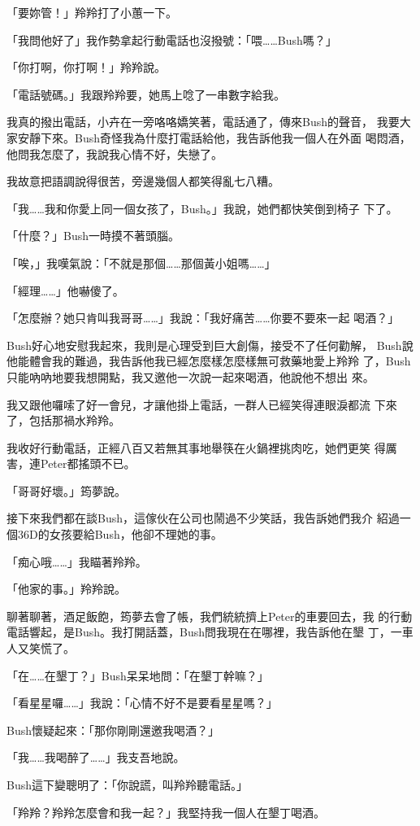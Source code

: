 「要妳管！」羚羚打了小蕙一下。

「我問他好了」我作勢拿起行動電話也沒撥號：「喂……Bush嗎？」

「你打啊，你打啊！」羚羚說。

「電話號碼。」我跟羚羚要，她馬上唸了一串數字給我。

我真的撥出電話，小卉在一旁咯咯嬌笑著，電話通了，傳來Bush的聲音，
我要大家安靜下來。Bush奇怪我為什麼打電話給他，我告訴他我一個人在外面
喝悶酒，他問我怎麼了，我說我心情不好，失戀了。

我故意把語調說得很苦，旁邊幾個人都笑得亂七八糟。

「我……我和你愛上同一個女孩了，Bush。」我說，她們都快笑倒到椅子
下了。

「什麼？」Bush一時摸不著頭腦。

「唉，」我嘆氣說：「不就是那個……那個黃小姐嗎……」

「經理……」他嚇傻了。

「怎麼辦？她只肯叫我哥哥……」我說：「我好痛苦……你要不要來一起
喝酒？」

Bush好心地安慰我起來，我則是心理受到巨大創傷，接受不了任何勸解，
Bush說他能體會我的難過，我告訴他我已經怎麼樣怎麼樣無可救藥地愛上羚羚
了，Bush只能吶吶地要我想開點，我又邀他一次說一起來喝酒，他說他不想出
來。

我又跟他囉嗦了好一會兒，才讓他掛上電話，一群人已經笑得連眼淚都流
下來了，包括那禍水羚羚。

我收好行動電話，正經八百又若無其事地舉筷在火鍋裡挑肉吃，她們更笑
得厲害，連Peter都搖頭不已。

「哥哥好壞。」筠夢說。

接下來我們都在談Bush，這傢伙在公司也鬧過不少笑話，我告訴她們我介
紹過一個36D的女孩要給Bush，他卻不理她的事。

「痴心哦……」我瞄著羚羚。

「他家的事。」羚羚說。

聊著聊著，酒足飯飽，筠夢去會了帳，我們統統擠上Peter的車要回去，我
的行動電話響起，是Bush。我打開話蓋，Bush問我現在在哪裡，我告訴他在墾
丁，一車人又笑慌了。

「在……在墾丁？」Bush呆呆地問：「在墾丁幹嘛？」

「看星星囉……」我說：「心情不好不是要看星星嗎？」

Bush懷疑起來：「那你剛剛還邀我喝酒？」

「我……我喝醉了……」我支吾地說。

Bush這下變聰明了：「你說謊，叫羚羚聽電話。」

「羚羚？羚羚怎麼會和我一起？」我堅持我一個人在墾丁喝酒。

